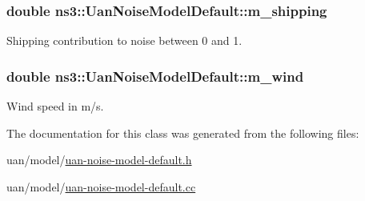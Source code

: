 \subsubsection[{\texorpdfstring{m\+\_\+shipping}{m_shipping}}]{\setlength{\rightskip}{0pt plus 5cm}double ns3\+::\+Uan\+Noise\+Model\+Default\+::m\+\_\+shipping\hspace{0.3cm}{\ttfamily [private]}}\hypertarget{classns3_1_1UanNoiseModelDefault_af04dd65db85045907b790b1e2dac9e4e}{}\label{classns3_1_1UanNoiseModelDefault_af04dd65db85045907b790b1e2dac9e4e}


Shipping contribution to noise between 0 and 1. 

\subsubsection[{\texorpdfstring{m\+\_\+wind}{m_wind}}]{\setlength{\rightskip}{0pt plus 5cm}double ns3\+::\+Uan\+Noise\+Model\+Default\+::m\+\_\+wind\hspace{0.3cm}{\ttfamily [private]}}\hypertarget{classns3_1_1UanNoiseModelDefault_a19160cf4ca2de1e498a25023336ad998}{}\label{classns3_1_1UanNoiseModelDefault_a19160cf4ca2de1e498a25023336ad998}


Wind speed in m/s. 



The documentation for this class was generated from the following files\+:\begin{DoxyCompactItemize}
\item 
uan/model/\hyperlink{uan-noise-model-default_8h}{uan-\/noise-\/model-\/default.\+h}\item 
uan/model/\hyperlink{uan-noise-model-default_8cc}{uan-\/noise-\/model-\/default.\+cc}\end{DoxyCompactItemize}
